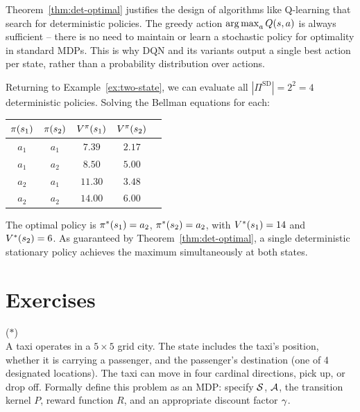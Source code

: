 \documentclass[11pt,a4paper]{article}
\begin{document}
\begin{rlconnection}[title={Why Deterministic Optimal Policies Exist}]
Theorem~\ref{thm:det-optimal} justifies the design of algorithms
like Q-learning that search for deterministic policies. The greedy
action $\operatorname{arg\,max}_a Q(s,a)$ is always sufficient -- there is no need
to maintain or learn a stochastic policy for optimality in standard
MDPs. This is why DQN and its variants output a single best action
per state, rather than a probability distribution over actions.
\end{rlconnection}

\begin{example}
\label{ex:two-state-optimal}
Returning to Example~\ref{ex:two-state}, we can evaluate all
$|\Pi^{\mathrm{SD}}| = 2^2 = 4$ deterministic policies. Solving the
Bellman equations for each:
\begin{center}
\begin{tabular}{ccccc}
\toprule
$\pi(s_1)$ & $\pi(s_2)$ & $V^{\pi}(s_1)$ & $V^{\pi}(s_2)$ \\
\midrule
$a_1$ & $a_1$ & $7.39$ & $2.17$ \\
$a_1$ & $a_2$ & $8.50$ & $5.00$ \\
$a_2$ & $a_1$ & $11.30$ & $3.48$ \\
$a_2$ & $a_2$ & $14.00$ & $6.00$ \\
\bottomrule
\end{tabular}
\end{center}
The optimal policy is $\pi^*(s_1) = a_2$,
$\pi^*(s_2) = a_2$, with $V^*(s_1) = 14$ and
$V^*(s_2) = 6$. As guaranteed by
Theorem~\ref{thm:det-optimal}, a single deterministic stationary
policy achieves the maximum simultaneously at both states.
\end{example}


\section{Exercises}
\label{sec:exercises}

\begin{exercise} \textnormal{(\(*\))} \\
A taxi operates in a $5 \times 5$ grid city. The state includes the
taxi's position, whether it is carrying a passenger, and the
passenger's destination (one of 4 designated locations). The taxi can
move in four cardinal directions, pick up, or drop off. Formally
define this problem as an MDP: specify $\mathcal{S}$, $\mathcal{A}$, the
transition kernel $P$, reward function $R$, and an appropriate
discount factor $\gamma$.
\end{exercise}
\end{document}
